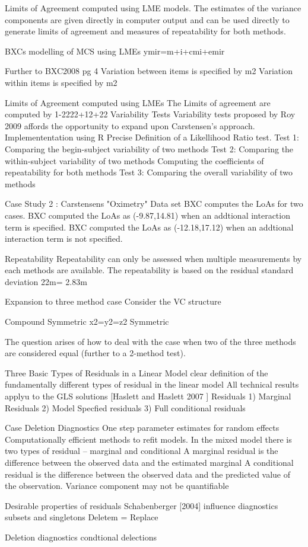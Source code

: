 Limits of Agreement computed using LME models.
The estimates of the variance components are given directly in computer output and can be used directly to generate
limits of agreement and measures of repeatability for both methods.

BXCs modelling of MCS using LMEs
ymir=m+i+cmi+emir
 
Further to BXC2008 pg 4
Variation between items is  specified by m2
Variation within items is  specified by m2
 
Limits of Agreement computed using LMEs
The Limits of agreement are computed by 1-2222+12+22
Variability Tests
Variability tests proposed by Roy 2009 affords the opportunity to expand upon Carstensen's approach.
Implemententation using R
Precise Definition of a Likellihood Ratio test.
Test 1: Comparing the begin-subject variability of two methods
Test 2: Comparing the within-subject variability of two methods
Computing the coefficients of repeatability for both methods
Test 3: Comparing the overall variability of two methods 
 
Case Study 2 : Carstensens "Oximetry" Data set
BXC computes the LoAs for two cases.
BXC computed the LoAs as (-9.87,14.81) when an addtional interaction term is specified.
BXC computed the LoAs as (-12.18,17.12) when an addtional interaction term is not specified.
 
Repeatability
Repeatability can only be assessed when multiple measurements by each methods are available.
The repeatability is based on the residual standard deviation 22m= 2.83m
 
Expansion to three method case
Consider the VC structure
 
Compound Symmetric     	x2=y2=z2
Symmetric                        
 
The question arises of how to deal with the case when two of the three methods are considered equal (further to a 2-method test). 

Three Basic Types of Residuals in a Linear Model
clear definition of the fundamentally different types of residual in the linear model
All technical results applyu to the GLS solutions
[Haslett and Haslett 2007 ]
Residuals
1) Marginal Residuals
2) Model Specfied residuals
3) Full conditional residuals

Case Deletion Diagnostics
One step parameter estimates for random effects
Computationally efficient methods to refit models.
In the mixed model there is two types of residual – marginal and conditional
A marginal residual is the difference between the observed data and the estimated marginal
A conditional residual is the difference between the observed data and the predicted value of the observation.
Variance component may not be quantifiable

Desirable properties of residuals
Schabenberger [2004] influence diagnostics
subsets and singletons
Deletem = Replace

Deletion diagnostics
condtional delections


 
 

